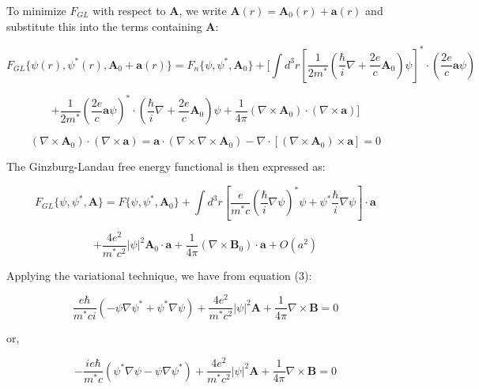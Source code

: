 \documentclass{article}
\begin{document}
To minimize $F_{GL}$ with respect to $\mathbf{A}$, we write $\mathbf{A}(r) = \mathbf{A}_0(r) + \mathbf{a}(r)$ and substitute this into the terms containing $\mathbf{A}$:

\begin{equation}
    F_{GL} \{ \psi(r), \psi^*(r), \mathbf{A}_0 + \mathbf{a}(r) \} = F_n \{ \psi, \psi^*, \mathbf{A}_0 \} + [ \int d^3r \left[ \frac{1}{2m^*} \left( \frac{\hbar}{i} \nabla + \frac{2e}{c} \mathbf{A}_0 \right)\psi \right]^* \cdot \left( \frac{2e}{c} \mathbf{a} \psi \right)
\end{equation}

\begin{equation}
+ \frac{1}{2m^*} \left( \frac{2e}{c} \mathbf{a} \psi \right)^* \cdot \left( \frac{\hbar}{i} \nabla + \frac{2e}{c} \mathbf{A}_0 \right) \psi + \frac{1}{4\pi} (\nabla \times \mathbf{A}_0) \cdot (\nabla \times \mathbf{a}) ]
\end{equation}

\[
(\nabla \times \mathbf{A}_0) \cdot (\nabla \times \mathbf{a}) = \mathbf{a} \cdot (\nabla \times \nabla \times \mathbf{A}_0) - \nabla \cdot \left[ (\nabla \times \mathbf{A}_0) \times \mathbf{a} \right] = 0
\]

The Ginzburg-Landau free energy functional is then expressed as:

\begin{equation}
    F_{GL} \{ \psi, \psi^*, \mathbf{A} \} = F \{ \psi, \psi^*, \mathbf{A}_0 \} + \int d^3r \left[ \frac{e}{m^* c} \left( \frac{\hbar}{i} \nabla \psi \right)^* \psi +  \psi^*    \frac{\hbar}{i} \nabla \psi \right] \cdot \mathbf{a}
\end{equation}

\begin{equation}
    + \frac{4 e^2}{m^* c^2} |\psi|^2 \mathbf{A}_0 \cdot \mathbf{a} + \frac{1}{4\pi} (\nabla \times \mathbf{B}_0) \cdot \mathbf{a} + O(a^2)
\end{equation}

Applying the variational technique, we have from equation (3):

\begin{equation}
    \frac{e \hbar}{m^* c i} \left( -\psi \nabla \psi^* + \psi^* \nabla \psi \right) + \frac{4 e^2}{m^* c^2} |\psi|^2 \mathbf{A} + \frac{1}{4\pi} \nabla \times \mathbf{B} = 0
\end{equation}

or,

\begin{equation}
    - \frac{i e \hbar}{m^* c} \left( \psi^* \nabla \psi - \psi \nabla \psi^* \right) + \frac{4 e^2}{m^* c^2} |\psi|^2 \mathbf{A} + \frac{1}{4\pi} \nabla \times \mathbf{B} = 0 \tag{19}
\end{equation}
\end{document}
